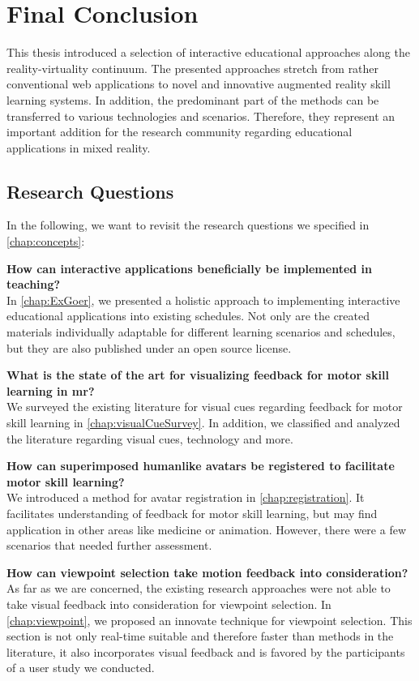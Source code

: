 %
\chapter{Final Conclusion}
\label{chap:conclusion}

This thesis introduced a selection of interactive educational approaches along the reality-virtuality continuum.
The presented approaches stretch from rather conventional web applications to novel and innovative augmented reality skill learning systems. In addition, the predominant part of the methods can be transferred to various technologies and scenarios. Therefore, they represent an important addition for the research community regarding educational applications in mixed reality. 

\section{Research Questions \label{sec:questions}}
In the following, we want to revisit the research questions we specified in \autoref{chap:concepts}:

\textbf{How can interactive applications beneficially be implemented in teaching?}\\
In \autoref{chap:ExGoer}, we presented a holistic approach to implementing interactive educational applications into existing schedules.
Not only are the created materials individually adaptable for different learning scenarios and schedules, but they are also published under an open source license.

\textbf{What is the state of the art for visualizing feedback for motor skill learning in \acrlong{mr}?}\\
We surveyed the existing literature for visual cues regarding feedback for motor skill learning in \autoref{chap:visualCueSurvey}. In addition, we classified and analyzed the literature regarding visual cues, technology and more.

\textbf{How can superimposed humanlike avatars be registered to facilitate motor skill learning?}\\
We introduced a method for avatar registration in \autoref{chap:registration}. It facilitates understanding of feedback for motor skill learning, but may find application in other areas like medicine or animation. However, there were a few scenarios that needed further assessment.

\textbf{How can viewpoint selection take motion feedback into consideration?}\\
As far as we are concerned, the existing research approaches were not able to take visual feedback into consideration for viewpoint selection. In \autoref{chap:viewpoint}, we proposed an innovate technique for viewpoint selection. This section is not only real-time suitable and therefore faster than methods in the literature, it also incorporates visual feedback and is favored by the participants of a user study we conducted.

